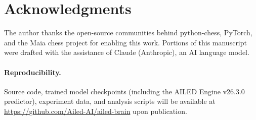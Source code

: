 \documentclass[11pt,a4paper]{article}
\begin{document}
\section*{Acknowledgments}

The author thanks the open-source communities behind python-chess, PyTorch,
and the Maia chess project for enabling this work.
Portions of this manuscript were drafted with the assistance of Claude
(Anthropic), an AI language model.

\paragraph{Reproducibility.}
Source code, trained model checkpoints (including the AILED Engine v26.3.0 predictor), experiment data, and analysis scripts will be available at \url{https://github.com/Ailed-AI/ailed-brain} upon publication.



\end{document}
